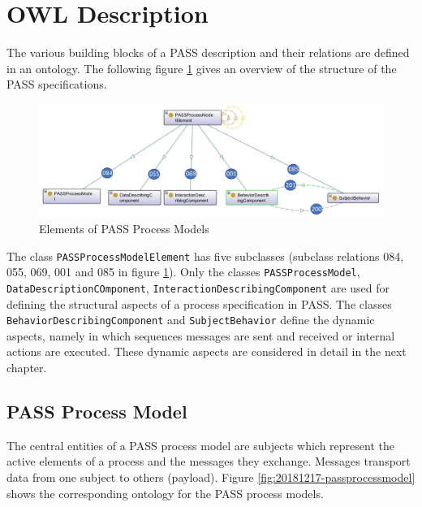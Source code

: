 \section{OWL Description}
\label{OWL-DescriptionSID}

The various building blocks of a PASS description and their relations are defined in an ontology. The following figure \ref{fig:20171217-passprocessmodellelement} gives an overview of the structure of the PASS specifications.   

\begin{figure}[htbp]
	\centering
	\includegraphics[width=0.9\linewidth]{Figures/Ontology/SubjectInteraction/20171217-PASSProcessModellElement}
	\caption[Elements of PASS Process Models]{Elements of PASS Process Models}
	\label{fig:20171217-passprocessmodellelement}
\end{figure}

The class \texttt{PASSProcessModelElement} has five subclasses (subclass relations 084, 055, 069, 001 and 085 in figure \ref{fig:20171217-passprocessmodellelement}). Only the classes \texttt{PASSProcessModel}, \texttt{DataDescriptionCOmponent}, \texttt{InteractionDescribingComponent} are used for defining the structural aspects of a process specification in PASS. The classes \texttt{BehaviorDescribingComponent} and \texttt{SubjectBehavior} define the dynamic aspects, namely in which sequences messages are sent and received or internal actions are executed. These dynamic aspects are considered in detail in the next chapter. 

\subsection{PASS Process Model}

The central entities of a PASS process model are subjects which represent the active elements of a process and the messages they exchange. Messages transport data from one subject to others (payload). Figure \ref{fig:20181217-passprocessmodel} shows the corresponding ontology for the PASS process models.

